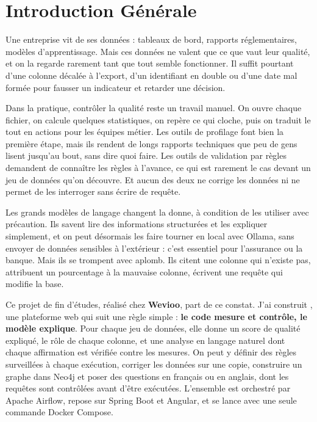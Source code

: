 \chapter*{Introduction Générale}

Une entreprise vit de ses données : tableaux de bord, rapports réglementaires, modèles d'apprentissage. Mais ces données ne valent que ce que vaut leur qualité, et on la regarde rarement tant que tout semble fonctionner. Il suffit pourtant d'une colonne décalée à l'export, d'un identifiant en double ou d'une date mal formée pour fausser un indicateur et retarder une décision.

Dans la pratique, contrôler la qualité reste un travail manuel. On ouvre chaque fichier, on calcule quelques statistiques, on repère ce qui cloche, puis on traduit le tout en actions pour les équipes métier. Les outils de profilage font bien la première étape, mais ils rendent de longs rapports techniques que peu de gens lisent jusqu'au bout, sans dire quoi faire. Les outils de validation par règles demandent de connaître les règles à l'avance, ce qui est rarement le cas devant un jeu de données qu'on découvre. Et aucun des deux ne corrige les données ni ne permet de les interroger sans écrire de requête.

Les grands modèles de langage changent la donne, à condition de les utiliser avec précaution. Ils savent lire des informations structurées et les expliquer simplement, et on peut désormais les faire tourner en local avec Ollama, sans envoyer de données sensibles à l'extérieur : c'est essentiel pour l'assurance ou la banque. Mais ils se trompent avec aplomb. Ils citent une colonne qui n'existe pas, attribuent un pourcentage à la mauvaise colonne, écrivent une requête qui modifie la base.

Ce projet de fin d'études, réalisé chez \textbf{Wevioo}, part de ce constat. J'ai construit \textbf{\projet}, une plateforme web qui suit une règle simple : \textbf{le code mesure et contrôle, le modèle explique}. Pour chaque jeu de données, elle donne un score de qualité expliqué, le rôle de chaque colonne, et une analyse en langage naturel dont chaque affirmation est vérifiée contre les mesures. On peut y définir des règles surveillées à chaque exécution, corriger les données sur une copie, construire un graphe dans Neo4j et poser des questions en français ou en anglais, dont les requêtes sont contrôlées avant d'être exécutées. L'ensemble est orchestré par Apache Airflow, repose sur Spring Boot et Angular, et se lance avec une seule commande Docker Compose.

